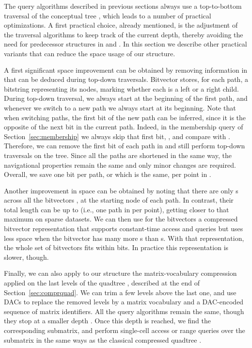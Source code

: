\documentclass{elsarticle}
\begin{document}
The query algorithms described in previous sections always use a top-to-bottom traversal of the conceptual tree , which leads to a number of practical optimizations.  A first practical choice, already mentioned, is the adjustment of the traversal algorithms to keep track of the current depth, thereby avoiding the need for predecessor structures in  and . In this section we describe other practical variants that can reduce the space usage of our structure.

A first significant space improvement can be obtained by removing information in  that can be deduced during top-down traversals. Bitvector  stores, for each path, a bitstring representing its nodes, marking whether each is a left or a right child. During top-down traversal, we always start at the beginning of the first path, and whenever we switch to a new path we always start at its beginning. Note that when switching paths, the first bit of the new path can be inferred, since it is the opposite of the next bit in the current path. Indeed, in the membership query of Section~\ref{sec:membership} we always skip that first bit, , and compare  with . Therefore, we can remove the first bit of each path in  and still perform top-down traversals on the tree. Since all the paths are shortened in the same way, the navigational properties remain the same and only minor changes are required. Overall, we save one bit per path, or which is the same, per point in .

Another improvement in space can be obtained by noting that there are only  s across all the bitvectors , at the starting node of each path. In contrast, their total length can be up to  (i.e., one path in  per point), getting closer to that maximum on sparse datasets. We can then use for the bitvectors  a compressed bitvector representation \cite{RRR} that supports constant-time access and  queries but uses less space when the bitvector has many more s than s. With that representation, the whole set of bitvectors  fits within  bits. In practice this representation is slower, though.

Finally, we can also apply to our structure the matrix-vocabulary compression applied on the last levels of the quadtree \cite{BLN14}, described at the end of  Section~\ref{sec:comprquad}. We can trim  a few levels above the last one, and use DACs to replace the removed levels by a matrix vocabulary and a DAC-encoded sequence of matrix identifiers. All the query algorithms remain the same, though they stop at a smaller depth . Once this depth is reached, we find the corresponding submatrix, and perform single-cell access or range queries over the submatrix in the same ways as the classical compressed quadtree \cite{BLN14}.
\end{document}
